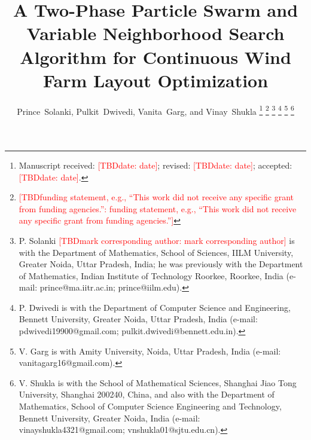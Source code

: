 \documentclass[journal,twoside]{IEEEtran}
\newcommand{\TBD}[1]{\textcolor{red}{[TBD\ifx\relax#1\relax\else: #1\fi]}}
\begin{document}
\title{A Two-Phase Particle Swarm and Variable Neighborhood Search Algorithm for Continuous Wind Farm Layout Optimization}
\author{Prince~Solanki, Pulkit~Dwivedi, Vanita~Garg, and Vinay~Shukla
\thanks{Manuscript received: \TBD{date}; revised: \TBD{date}; accepted: \TBD{date}.}
\thanks{\TBD{funding statement, e.g., ``This work did not receive any specific grant from funding agencies.''}}
\thanks{P. Solanki \TBD{mark corresponding author} is with the Department of Mathematics, School of Sciences, IILM University, Greater Noida, Uttar Pradesh, India; he was previously with the Department of Mathematics, Indian Institute of Technology Roorkee, Roorkee, India (e-mail: prince@ma.iitr.ac.in; prince@iilm.edu).}
\thanks{P. Dwivedi is with the Department of Computer Science and Engineering, Bennett University, Greater Noida, Uttar Pradesh, India (e-mail: pdwivedi19900@gmail.com; pulkit.dwivedi@bennett.edu.in).}
\thanks{V. Garg is with Amity University, Noida, Uttar Pradesh, India (e-mail: vanitagarg16@gmail.com).}
\thanks{V. Shukla is with the School of Mathematical Sciences, Shanghai Jiao Tong University, Shanghai 200240, China, and also with the Department of Mathematics, School of Computer Science Engineering and Technology, Bennett University, Greater Noida, India (e-mail: vinayshukla4321@gmail.com; vnshukla01@sjtu.edu.cn).}}

\maketitle
\end{document}
